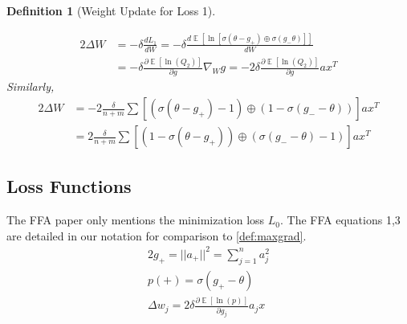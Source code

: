 \documentclass[12pt]{iopart}
\theoremstyle{break}
\newtheorem{prop}{Definition}[section]
\DeclareMathOperator{\E}{\mathbb{E}}
\begin{document}
\begin{prop}[Weight Update for Loss 1]
\label{def:mingrad}
\begin{description}\item
\begin{alignat}{2}
\Delta W &= - \delta \frac{dL_1}{dW} = - \delta  \frac{d\E[\ln[\sigma(\theta-g_+)\oplus\sigma(g_-\theta)]]}{dW} \\
&= - \delta  \frac{\partial \E[\ln(Q_2)]}{\partial g} \nabla_W g = - 2 \delta  \frac{\partial \E[\ln(Q_2)]}{\partial g} a x^T
\end{alignat}
Similarly,
\begin{alignat}{2}
\Delta W &= - 2 \frac{\delta}{n+m}\sum[(\sigma(\theta - g_+) - 1)\oplus(1 - \sigma(g_--\theta))] a x^T \\
&= 2 \frac{\delta}{n+m}\sum[(1-\sigma(\theta - g_+))\oplus(\sigma(g_--\theta)-1)] a x^T
\end{alignat}
\end{description}
\end{prop}
\subsection{Loss Functions}
The FFA paper \cite{FFA23} only mentions the minimization loss $L_0$.
The FFA equations 1,3 are detailed in our notation for comparison to \ref{def:maxgrad}.
\begin{alignat}{2}
g_+ = ||a_+||^2 = \sum_{j=1}^n a_j^2 \\
p(+) = \sigma(g_+ - \theta) \\
\Delta w_j = 2 \delta \frac{\partial \E[\ln(p)]}{\partial g_j} a_j x
\end{alignat}
\end{document}
